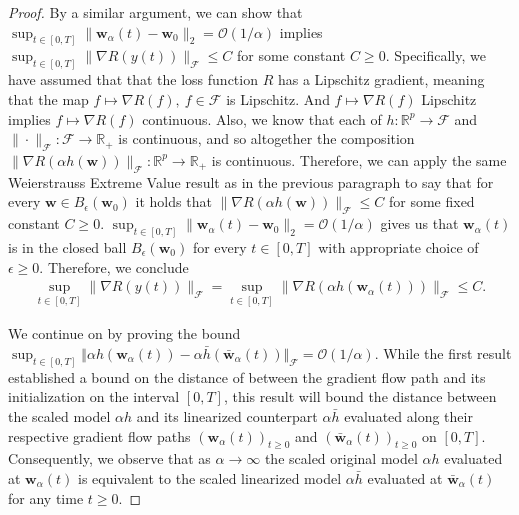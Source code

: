 \documentclass{article}
\begin{document}
\begin{proof}
By a similar argument, we can show that $\sup_{t \in [0, T]} \|\boldsymbol{w}_{\alpha}(t) - \boldsymbol{w}_0 \|_2 = \mathcal{O}(1/ \alpha)$ implies $\sup_{t \in [0, T]} \| \nabla R(y(t))\|_{\mathcal{F}}\leq C$ for some constant $C \geq 0$. Specifically, we have assumed that that the loss function $R$ has a Lipschitz gradient, meaning that the map $f \mapsto \nabla R(f), \ f \in \mathcal{F}$ is Lipschitz. And $f \mapsto \nabla R(f)$ Lipschitz implies $f \mapsto \nabla R(f)$ continuous. Also, we know that each of $h: \mathbb{R}^p \rightarrow \mathcal{F}$ and $\| \cdot \|_{\mathcal{F}}: \mathcal{F} \rightarrow \mathbb{R}_+$ is continuous, and so altogether the composition $\|\nabla R(\alpha h(\boldsymbol{w}))\|_{\mathcal{F}}: \mathbb{R}^p \rightarrow \mathbb{R}_+$ is continuous. Therefore, we can apply the same  Weierstrauss Extreme Value result as in the previous paragraph to say that for every $\boldsymbol{w} \in B_{\epsilon}(\boldsymbol{w}_0)$ it holds that $\|\nabla R(\alpha h(\boldsymbol{w}))\|_{\mathcal{F}} \leq C$ for some fixed constant $C \geq 0$. $\sup_{t \in [0, T]} \|\boldsymbol{w}_{\alpha}(t) - \boldsymbol{w}_0 \|_2 = \mathcal{O}(1/\alpha)$ gives us that $\boldsymbol{w}_{\alpha}(t)$ is in the closed ball $B_{\epsilon}(\boldsymbol{w}_0)$ for every $t \in [0, T]$ with appropriate choice of $\epsilon \geq 0$. Therefore, we conclude
\begin{align*}
    \sup_{t \in [0, T]} \| \nabla R(y(t))\|_{\mathcal{F}} = \sup_{t \in [0, T]} \| \nabla R(\alpha h(\boldsymbol{w}_{\alpha}(t)))\|_{\mathcal{F}} \leq C.
\end{align*}

We continue on by proving the bound $\sup_{t \in [0, T]} \Vert \alpha h(\boldsymbol{w}_{\alpha}(t)) - \alpha \bar{h}(\boldsymbol{\bar{w}}_{\alpha}(t)) \Vert_{\mathcal{F}} = \mathcal{O}(1/\alpha).$ While the first result established a bound on the distance of between the gradient flow path and its initialization on the interval $[0, T]$, this result will bound the distance between the scaled model $\alpha h$ and its linearized counterpart $\alpha \bar{h}$ evaluated along their respective gradient flow paths $(\boldsymbol{w}_{\alpha}(t))_{t \geq 0}$ and $(\boldsymbol{\bar{w}}_{\alpha}(t))_{t \geq 0}$ on $[0, T]$. Consequently, we observe that as $\alpha \rightarrow \infty$ the scaled original model $\alpha h$ evaluated at $\boldsymbol{w}_{\alpha}(t)$ is equivalent to the scaled linearized model $\alpha \bar{h}$ evaluated at $\boldsymbol{\bar{w}}_{\alpha}(t)$ for any time $t \geq 0$.


\end{proof}
\end{document}
